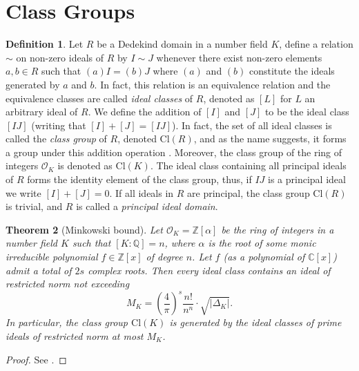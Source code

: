 \documentclass[openany, a4paper, 10pt]{book}
\theoremstyle{plain}
\newtheorem{theorem}{Theorem}[chapter]
\theoremstyle{plain}
\theoremstyle{plain}
\theoremstyle{definition}
\newtheorem{definition}[theorem]{Definition}
\theoremstyle{plain}
\theoremstyle{definition}
\theoremstyle{remark}
\begin{document}
\section{Class Groups}\label{sec:class_groups}
\begin{definition}
    Let $R$ be a Dedekind domain in a number field $K$, define a relation $\sim$ on non-zero ideals of $R$
    by $I \sim J$ whenever there exist non-zero elements $a,b \in R$ such that $(a)I = (b)J$ where $(a)$ and $(b)$ constitute the ideals generated by $a$ and $b$.
    In fact, this relation is an equivalence relation \cite{equiv_rel_classes} and the equivalence classes are called \textit{ideal classes} of $R$, denoted as $[L]$ for $L$ an arbitrary ideal of $R$.
    We define the addition of $[I]$ and $[J]$ to be the ideal class $[IJ]$ (writing that $[I] + [J] = [IJ]$).
    In fact, the set of all ideal classes is called the \textit{class group} of $R$, denoted $\mathrm{Cl}(R)$, and as the name suggests, it forms a group under this addition operation \cite[Corollary~1]{marcus}.
    Moreover, the class group of the ring of integers $\mathcal O_K$ is denoted as $\mathrm{Cl}(K)$.
    The ideal class containing all principal ideals of $R$ forms the identity element of the class group, thus, if $IJ$ is a principal ideal we write $[I] + [J] = 0$.
    If all ideals in $R$ are principal, the class group $\mathrm{Cl}(R)$ is trivial, and $R$ is called a \textit{principal ideal domain}.
\end{definition}

\begin{theorem}[Minkowski bound]
    Let $\mathcal O_K = \mathbb Z[\alpha]$ be the ring of integers in a number field $K$ such that $[K:\mathbb Q] = n$, where $\alpha$ is the root of some monic irreducible polynomial $f \in \mathbb Z[x]$ of degree $n$.
    Let $f$ (as a polynomial of $\mathbb C[x]$) admit a total of $2s$ complex roots.
    Then every ideal class contains an ideal of restricted norm not exceeding
    $$M_K = \left( \frac{4}{\pi} \right)^s \frac{n!}{n^n} \cdot \sqrt{|\Delta_K|}.$$
    In particular, the class group $\mathrm{Cl}(K)$ is generated by the ideal classes of prime ideals of restricted norm at most $M_K$.
\end{theorem}
\begin{proof}
    See \cite[Theorem~5.9]{ANT_dictaat}.
\end{proof}
\end{document}
